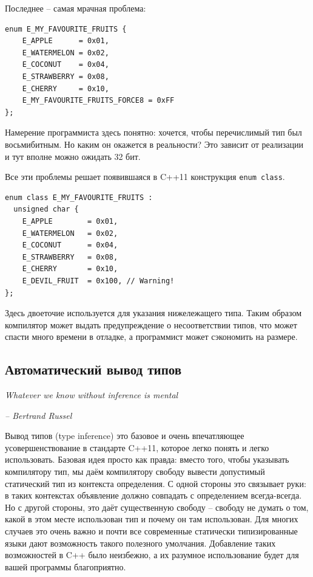 \documentclass[a4paper,12pt,oneside]{article}
\begin{document}
Последнее -- самая мрачная проблема:

\begin{lstlisting}
enum E_MY_FAVOURITE_FRUITS {
    E_APPLE      = 0x01,
    E_WATERMELON = 0x02,
    E_COCONUT    = 0x04,
    E_STRAWBERRY = 0x08,
    E_CHERRY     = 0x10,
    E_MY_FAVOURITE_FRUITS_FORCE8 = 0xFF
};
\end{lstlisting}

Намерение программиста здесь понятно: хочется, чтобы перечислимый тип был восьмибитным. Но каким он окажется в реальности? Это зависит от реализации и тут вполне можно ожидать 32 бит.

Все эти проблемы решает появившаяся в C++11 конструкция \lstinline!enum class!.

\begin{lstlisting}
enum class E_MY_FAVOURITE_FRUITS : 
  unsigned char {
    E_APPLE        = 0x01,
    E_WATERMELON   = 0x02,
    E_COCONUT      = 0x04,
    E_STRAWBERRY   = 0x08,
    E_CHERRY       = 0x10,
    E_DEVIL_FRUIT  = 0x100, // Warning!
};
\end{lstlisting}

Здесь двоеточие используется для указания нижележащего типа. Таким образом компилятор может выдать предупреждение о несоответствии типов, что может спасти много времени в отладке, а программист может сэкономить на размере. 

\pagebreak
\subsection{Автоматический вывод типов}\label{TypeInference}

\hfill\textit{Whatever we know without inference is mental}{\vspace{0.5em}}

\hfill\textit{-- Bertrand Russel}

Вывод типов (type inference) это базовое и очень впечатляющее усовершенствование в стандарте C++11, которое легко понять и легко использовать. Базовая идея просто как правда: вместо того, чтобы указывать компилятору тип, мы даём компилятору свободу вывести допустимый статический тип из контекста определения. С одной стороны это связывает руки: в таких контекстах объявление должно совпадать с определением всегда-всегда. Но с другой стороны, это даёт существенную свободу -- свободу не думать о том, какой в этом месте использован тип и почему он там использован. Для многих случаев это очень важно и почти все современные статически типизированные языки дают возможность такого полезного умолчания. Добавление таких возможностей в C++ было неизбежно, а их разумное использование будет для вашей программы благоприятно.
\end{document}
